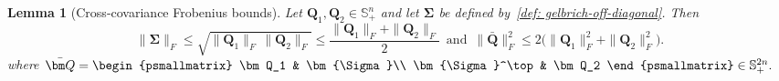 \documentclass[opre,sglanonrev]{informs4}
\newtheorem{lemma}{Lemma}
\newcommand{\mbS}{\mathbb S}
\newcommand{\bQ}{\bm Q}
\newcommand{\bSigma}{\bm{\Sigma}}
\begin{document}
{\begin{APPENDICES}


\begin{lemma}[Cross-covariance Frobenius bounds]
\label{lem:Sigma-bound}
Let $\bQ_1,\bQ_2\in \mbS^n_+$ and let $\bSigma$ be defined by~\eqref{def: gelbrich-off-diagonal}. Then
\begin{equation}
\label{eq:Sigma-Fbound}
\|\bSigma\|_F
\le
\sqrt{\|\bQ_1\|_F\,\|\bQ_2\|_F}
\le
\frac{\|\bQ_1\|_F+\|\bQ_2\|_F}{2} \,\,\, \text{and} \,\,\, \|\bar{\bQ}\|_F^2
\le
2\bigl(
\|\bQ_1\|_F^2+\|\bQ_2\|_F^2
\bigr).
\end{equation}
where $\bar{\bQ}
=
\begin{psmallmatrix}
\bQ_1 & \bSigma\\
\bSigma^\top & \bQ_2
\end{psmallmatrix}
\in \mbS^{2n}_+.$
\end{lemma}


\end{APPENDICES}}
\end{document}
